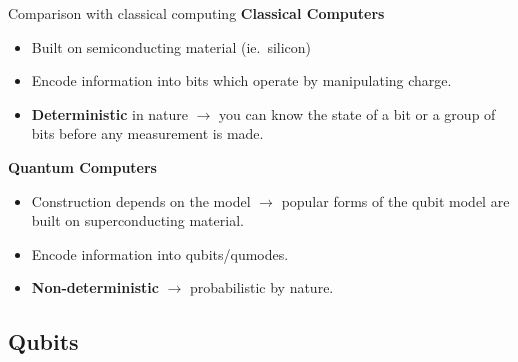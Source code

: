\documentclass{beamer}
\begin{document}
\begin{frame}{Comparison with classical computing}
	\textbf{Classical Computers}
	\begin{itemize}
		\item Built on semiconducting material (ie.\ silicon)
		\item Encode information into bits which operate by manipulating charge.
		\item \textbf{Deterministic} in nature $\rightarrow$ you can know the state of a bit or a group of bits before any measurement is made.
	\end{itemize}
	\textbf{Quantum Computers}
	\begin{itemize}
		\item Construction depends on the model $\rightarrow$ popular forms of the qubit model are built on superconducting material.
		\item Encode information into qubits/qumodes.
		\item \textbf{Non-deterministic} $\rightarrow$ probabilistic by nature.
	\end{itemize}
\end{frame}

\subsection{Qubits}
\end{document}

